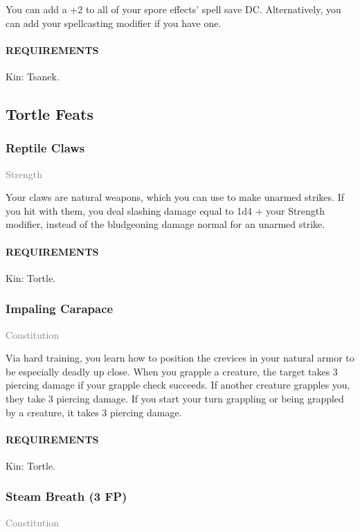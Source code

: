     \normalsize
    You can add a +2 to all of your spore effects' spell save DC.
    Alternatively, you can add your spellcasting modifier if you have one.
    \paragraph{REQUIREMENTS} Kin: Tsanek.

\subsection*{Tortle Feats}
    \subsubsection{Reptile Claws} \label{feat::reptileclaws}
    \small{\textcolor{gray}{Strength}}

    \normalsize
    Your claws are natural weapons, which you can use to make unarmed strikes.
    If you hit with them, you deal slashing damage equal to 1d4 + your Strength modifier, instead of the bludgeoning damage normal for an unarmed strike.
    \paragraph{REQUIREMENTS} Kin: Tortle.

    \subsubsection{Impaling Carapace} \label{feat::impalingcarapace}
    \small{\textcolor{gray}{Constitution}}

    \normalsize
    Via hard training, you learn how to position the crevices in your natural armor to be especially deadly up close.
    When you grapple a creature, the target takes 3 piercing damage if your grapple check succeeds.
    If another creature grapples you, they take 3 piercing damage.
    If you start your turn grappling or being grappled by a creature, it takes 3 piercing damage.
    \paragraph{REQUIREMENTS} Kin: Tortle.

    \subsubsection{Steam Breath (3 FP)} \label{feat::steambreath}
    \small{\textcolor{gray}{Constitution}}

